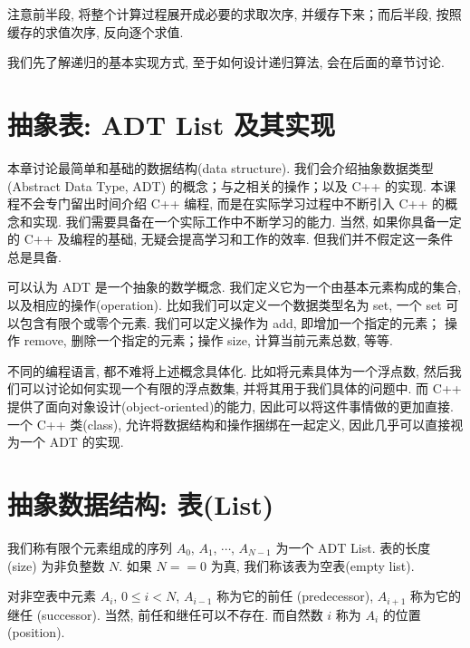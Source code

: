 \documentclass[a4paper]{ctexart}
\theoremstyle{definition}
\theoremstyle{definition}
\begin{document}
注意前半段, 将整个计算过程展开成必要的求取次序, 并缓存下来；而后半段, 按照缓存的求值次序, 
反向逐个求值.

我们先了解递归的基本实现方式, 至于如何设计递归算法, 会在后面的章节讨论. 

\section{抽象表: ADT List 及其实现}
本章讨论最简单和基础的数据结构(data structure). 我们会介绍抽象数据类型
(Abstract Data Type, ADT) 的概念；与之相关的操作；以及 C++ 的实现.
本课程不会专门留出时间介绍 C++ 编程, 而是在实际学习过程中不断引入 C++
的概念和实现. 我们需要具备在一个实际工作中不断学习的能力. 当然, 如果你具备一定的
C++ 及编程的基础, 无疑会提高学习和工作的效率. 但我们并不假定这一条件总是具备.

可以认为 ADT 是一个抽象的数学概念. 我们定义它为一个由基本元素构成的集合,
以及相应的操作(operation). 比如我们可以定义一个数据类型名为 set,
一个 set 可以包含有限个或零个元素. 我们可以定义操作为 add, 即增加一个指定的元素；
操作 remove, 删除一个指定的元素；操作 size, 计算当前元素总数, 等等.

不同的编程语言, 都不难将上述概念具体化. 比如将元素具体为一个浮点数,
然后我们可以讨论如何实现一个有限的浮点数集, 并将其用于我们具体的问题中. 而 C++
提供了面向对象设计(object-oriented)的能力, 因此可以将这件事情做的更加直接. 一个
C++ 类(class), 允许将数据结构和操作捆绑在一起定义, 因此几乎可以直接视为一个 ADT
的实现.

\section{抽象数据结构: 表(List)}

我们称有限个元素组成的序列 $A_0$, $A_1$, $\cdots$, $A_{N - 1}$ 为一个 ADT List.
表的长度 (size) 为非负整数 $N$. 如果 $N == 0$ 为真, 我们称该表为空表(empty list).

对非空表中元素 $A_i$, $0 \leq i < N$, $A_{i - 1}$ 称为它的前任 (predecessor),
$A_{i + 1}$ 称为它的继任 (successor). 当然, 前任和继任可以不存在. 而自然数 $i$ 称为
$A_i$ 的位置 (position).
\end{document}
